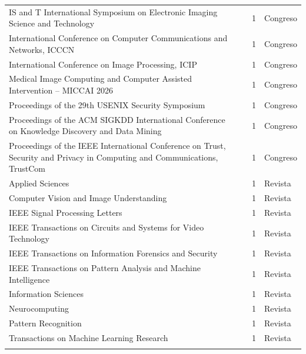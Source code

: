 \begin{table}[p]
\begin{tabularx}{\textwidth}{@{}Y{1.0}L{3.2cm}cl@{}}
IS and T International Symposium on Electronic Imaging Science and Technology & \cite{S0154} & 1 & Congreso \\
International Conference on Computer Communications and Networks, ICCCN & \cite{S0066} & 1 & Congreso \\
International Conference on Image Processing, ICIP & \cite{S0127} & 1 & Congreso \\
Medical Image Computing and Computer Assisted Intervention – MICCAI 2026 & \cite{S0202} & 1 & Congreso \\
Proceedings of the 29th USENIX Security Symposium & \cite{S0060} & 1 & Congreso \\
Proceedings of the ACM SIGKDD International Conference on Knowledge Discovery and Data Mining & \cite{S0137} & 1 & Congreso \\
Proceedings of the IEEE International Conference on Trust, Security and Privacy in Computing and Communications, TrustCom & \cite{S0036} & 1 & Congreso \\
Applied Sciences & \cite{S0647} & 1 & Revista \\
Computer Vision and Image Understanding & \cite{S0126} & 1 & Revista \\
IEEE Signal Processing Letters & \cite{S0020} & 1 & Revista \\
IEEE Transactions on Circuits and Systems for Video Technology & \cite{S0107} & 1 & Revista \\
IEEE Transactions on Information Forensics and Security & \cite{S0047} & 1 & Revista \\
IEEE Transactions on Pattern Analysis and Machine Intelligence & \cite{S0095} & 1 & Revista \\
Information Sciences & \cite{S0071} & 1 & Revista \\
Neurocomputing & \cite{S0092} & 1 & Revista \\
Pattern Recognition & \cite{S0041} & 1 & Revista \\
Transactions on Machine Learning Research & \cite{S0111} & 1 & Revista \\
\botrule
\end{tabularx}
\end{table}
